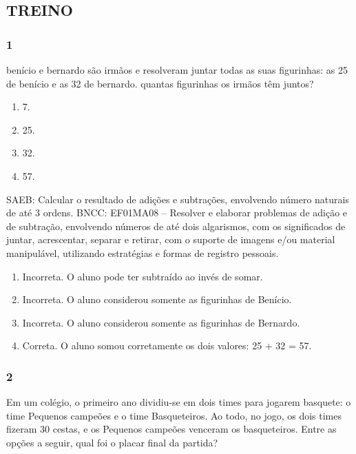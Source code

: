 \subsection{TREINO}\label{treino-1}

\subsubsection{1}\label{section-23}

benício e bernardo são irmãos e resolveram juntar todas as
suas figurinhas: as 25 de benício e as 32 de bernardo. quantas figurinhas os
irmãos têm juntos?

\begin{enumerate}
\def\labelenumi{\Alph{enumi})}
\item
  7.
\item
  25.
\item
  32.
\item
  57.
\end{enumerate}

SAEB: Calcular o resultado de adições e subtrações, envolvendo
número naturais de até 3 ordens.
BNCC: EF01MA08 -- Resolver e elaborar problemas de adição e de subtração,
envolvendo números de até dois algarismos, com os significados de juntar, acrescentar, separar e retirar, com o suporte de imagens e/ou material manipulável, utilizando estratégias e formas de registro pessoais.

\begin{enumerate}
\def\labelenumi{\alph{enumi})}
\item
  Incorreta. O aluno pode ter subtraído ao invés de somar.
\item
  Incorreta. O aluno considerou somente as figurinhas de Benício.
\item
  Incorreta. O aluno considerou somente as figurinhas de Bernardo.
\item
  Correta. O aluno somou corretamente os dois valores: 25 + 32 = 57.
\end{enumerate}

\subsubsection{2}\label{section-24}

Em um colégio, o primeiro ano dividiu-se em dois times para jogarem basquete: o time Pequenos campeões e o time Basqueteiros. Ao todo, no jogo, os dois times fizeram 30 cestas, e os Pequenos campeões venceram os basqueteiros. Entre as opções a seguir, qual foi o placar final da partida?

